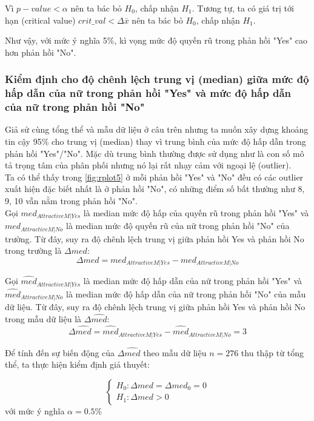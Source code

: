 \documentclass[a4paper,12pt]{article}
\begin{document}
	Vì $p-value < \alpha$ nên ta bác bỏ $H_0$, chấp nhận $H_1$. Tương tự, ta có giá trị tới hạn (critical value) $crit\_val < \Delta\bar{x}$ nên ta bác bỏ $H_0$, chấp nhận $H_1$. 
	
	Như vậy, với mức ý nghĩa 5\%, kì vọng mức độ quyến rũ trong phản hồi "Yes" cao hơn phản hồi "No".

	\subsubsection{Kiểm định cho độ chênh lệch trung vị (median) giữa mức độ hấp dẫn của nữ trong phản hồi "Yes" và mức độ hấp dẫn của nữ trong phản hồi "No"}
	
	Giả sử cùng tổng thể và mẫu dữ liệu ở câu trên nhưng ta muốn xây dựng khoảng tin cậy 95\% cho
	trung vị (median) thay vì trung bình của mức độ hấp dẫn trong phản hồi "Yes"/"No". Mặc dù trung bình thường được sử dụng như là con số mô tả trọng tâm của phân phối nhưng nó lại rất nhạy cảm với ngoại lệ (outlier).\\
	
	Ta có thể thấy trong \ref{fig:rplot5} ở mỗi phản hồi "Yes" và "No" đều có các outlier xuất hiện đặc biết nhất là ở phản hồi "No", có những điểm số bất thường như 8, 9, 10 vẫn nằm trong phản hồi "No".\\
	
	Gọi $med_{AttractiveM|Yes}$ là median mức độ hấp của quyến rũ trong phản hồi "Yes" và $med_{AttractiveM|No}$ là median mức độ quyến rũ của nữ trong phản hồi "No" của trường. Từ đây, suy ra độ chênh lệch trung vị giữa phản hồi Yes và phản hồi No trong trường là $\Delta med$:
	$$\Delta med = med_{AttractiveM|Yes} - med_{AttractiveM|No}$$
	
	Gọi $\hat{med}_{AttractiveM|Yes}$ là median mức độ hấp dẫn của nữ trong phản hồi "Yes" và  $\hat{med}_{AttractiveM|No}$ là median mức độ hấp dẫn của nữ trong phản hồi "No" của mẫu dữ liệu. Từ đây, suy ra độ chênh lệch trung vị giữa phản hồi Yes và phản hồi No trong mẫu dữ liệu là $\Delta\hat{med}$:
	$$\Delta\hat{med} = \hat{med}_{AttractiveM|Yes} - \hat{med}_{AttractiveM|No} = 3$$
	
	Để tính đến sự biến động của $\Delta\hat{med}$ theo mẫu dữ liệu $n = 276$ thu thập từ tổng thể, ta thực hiện kiểm định giả thuyết:
	
	\begin{equation*}
	\begin{cases}
	H_0: \Delta med = \Delta med_0 = 0\\
	H_1: \Delta med > 0
	\end{cases}
	\end{equation*}
	với mức ý nghĩa $\alpha = 0.5\%$
	
\end{document}
